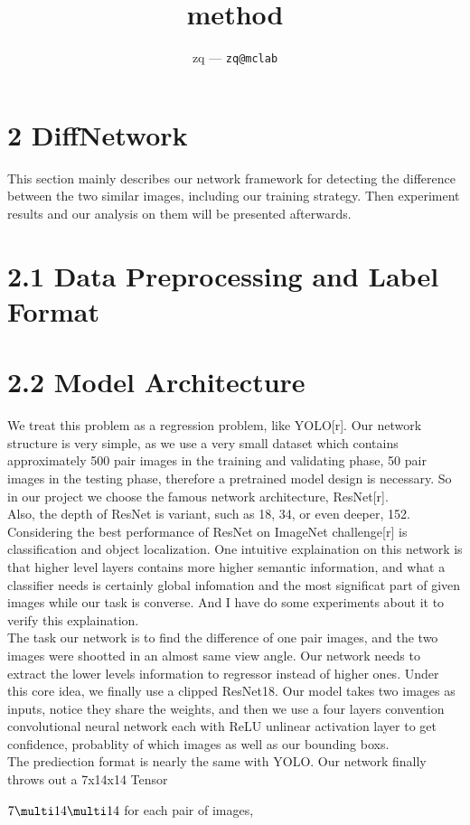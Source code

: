 \documentclass[12pt]{article}
\title{
	method
}
\author{
	zq --- \texttt{zq@mclab}
}
\begin{document}
\maketitle

\section{2 DiffNetwork}

This section mainly describes our network framework for detecting the difference between the two similar images, including our training strategy. Then experiment results and our analysis on them will be presented afterwards.\\

\section{2.1 Data Preprocessing and Label Format}


\section{2.2 Model Architecture}

We treat this problem as a regression problem, like YOLO[r]. Our network structure is very simple, as we use a very small dataset which contains approximately 500 pair images in the training and validating phase,  50 pair images in the testing phase, therefore a pretrained model design is necessary. So in our project we choose the famous network architecture, ResNet[r].\\

Also, the depth of ResNet is variant, such as 18, 34, or even deeper, 152. Considering the best performance of ResNet on ImageNet challenge[r] is classification and object localization. One intuitive explaination on this network is that higher level layers contains more higher semantic information, and what a classifier needs is certainly global infomation and the most significat part of given images while our task is converse. And I have do some experiments about it to verify this explaination.\\

The task our network is to find the difference of one pair images, and the two images were shootted in an almost same view angle. Our network needs to extract the lower levels information to regressor instead of higher ones. Under this core idea, we finally use a clipped ResNet18. Our model takes two images as inputs, notice they share the weights, and then we use a four layers convention convolutional neural network each with ReLU unlinear activation layer to get confidence, probablity of which images as well as our bounding boxs.\\

The prediection format is nearly the same with YOLO. Our network finally throws out a 7x14x14 Tensor


$7\multi14\multi14$ for each pair of images,
\end{document}
